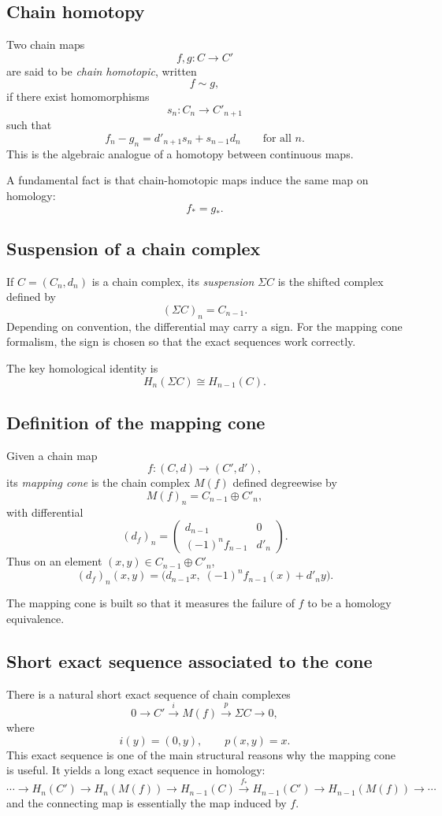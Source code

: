 \documentclass[12pt,a4paper]{article}
\theoremstyle{notespace}
\begin{document}
\subsection{Chain homotopy}

Two chain maps
\[
f,g:C\to C'
\]
are said to be \emph{chain homotopic}, written
\[
f\sim g,
\]
if there exist homomorphisms
\[
s_n:C_n\to C'_{n+1}
\]
such that
\[
f_n-g_n=d'_{n+1}s_n+s_{n-1}d_n
\qquad\text{for all }n.
\]
This is the algebraic analogue of a homotopy between continuous maps.

A fundamental fact is that chain-homotopic maps induce the same map on homology:
\[
f_*=g_*.
\]

\subsection{Suspension of a chain complex}

If \(C=(C_n,d_n)\) is a chain complex, its \emph{suspension} \(\Sigma C\) is the shifted complex defined by
\[
(\Sigma C)_n=C_{n-1}.
\]
Depending on convention, the differential may carry a sign. For the mapping cone formalism, the sign is chosen so that the exact sequences work correctly.

The key homological identity is
\[
H_n(\Sigma C)\cong H_{n-1}(C).
\]

\subsection{Definition of the mapping cone}

Given a chain map
\[
f:(C,d)\to (C',d'),
\]
its \emph{mapping cone} is the chain complex \(M(f)\) defined degreewise by
\[
M(f)_n=C_{n-1}\oplus C'_n,
\]
with differential
\[
(d_f)_n=
\begin{pmatrix}
	d_{n-1} & 0\\
	(-1)^n f_{n-1} & d'_n
\end{pmatrix}.
\]
Thus on an element \((x,y)\in C_{n-1}\oplus C'_n\),
\[
(d_f)_n(x,y)=\bigl(d_{n-1}x,\; (-1)^n f_{n-1}(x)+d'_n y\bigr).
\]

The mapping cone is built so that it measures the failure of \(f\) to be a homology equivalence.

\subsection{Short exact sequence associated to the cone}

There is a natural short exact sequence of chain complexes
\[
0\longrightarrow C' \xrightarrow{i} M(f)\xrightarrow{p} \Sigma C \longrightarrow 0,
\]
where
\[
i(y)=(0,y),
\qquad
p(x,y)=x.
\]
This exact sequence is one of the main structural reasons why the mapping cone is useful. It yields a long exact sequence in homology:
\[
\cdots \to H_n(C') \to H_n(M(f)) \to H_{n-1}(C)\xrightarrow{f_*} H_{n-1}(C') \to H_{n-1}(M(f)) \to \cdots
\]
and the connecting map is essentially the map induced by \(f\).
\end{document}
